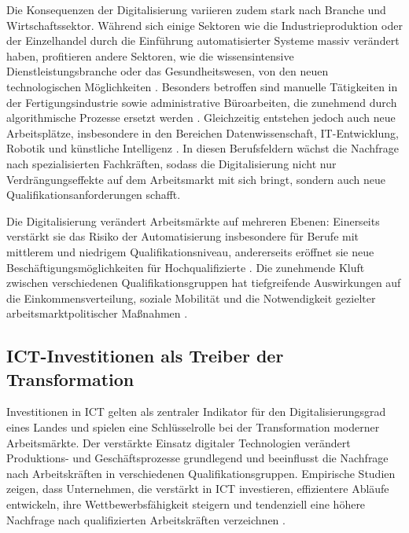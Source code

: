 Die Konsequenzen der Digitalisierung variieren zudem stark nach Branche und 
Wirtschaftssektor. Während sich einige Sektoren wie die Industrieproduktion oder der 
Einzelhandel durch die Einführung automatisierter Systeme massiv verändert haben, 
profitieren andere Sektoren, wie die wissensintensive Dienstleistungsbranche oder das 
Gesundheitswesen, von den neuen technologischen Möglichkeiten 
\parencite[vgl.][S. 1555]{autor2013thegrowth}. Besonders betroffen sind manuelle Tätigkeiten 
in der Fertigungsindustrie sowie administrative Büroarbeiten, die zunehmend durch 
algorithmische Prozesse ersetzt werden \parencite[vgl.][S. 260]{frey2013thefuture}. 
Gleichzeitig entstehen jedoch auch neue Arbeitsplätze, insbesondere in den Bereichen 
Datenwissenschaft, IT-Entwicklung, Robotik und künstliche Intelligenz 
\parencite[vgl.][S. 2510]{goos2014explaining}. In diesen Berufsfeldern wächst die Nachfrage 
nach spezialisierten Fachkräften, sodass die Digitalisierung nicht nur Verdrängungseffekte auf 
dem Arbeitsmarkt mit sich bringt, sondern auch neue Qualifikationsanforderungen schafft.

Die Digitalisierung verändert Arbeitsmärkte auf mehreren Ebenen: Einerseits verstärkt sie 
das Risiko der Automatisierung insbesondere für Berufe mit mittlerem und niedrigem 
Qualifikationsniveau, andererseits eröffnet sie neue Beschäftigungsmöglichkeiten für 
Hochqualifizierte \parencite[vgl.][S. 1555]{autor2013thegrowth}. Die zunehmende Kluft zwischen 
verschiedenen Qualifikationsgruppen hat tiefgreifende Auswirkungen auf die 
Einkommensverteilung, soziale Mobilität und die Notwendigkeit gezielter 
arbeitsmarktpolitischer Maßnahmen \parencite[S. 2510]{goos2014explaining}.


\subsection{ICT-Investitionen als Treiber der Transformation}

Investitionen in \ac{ICT} gelten als zentraler Indikator für den 
Digitalisierungsgrad eines Landes und spielen eine Schlüsselrolle bei der Transformation 
moderner Arbeitsmärkte. Der verstärkte Einsatz digitaler Technologien verändert 
Produktions- und Geschäftsprozesse grundlegend und beeinflusst die Nachfrage nach 
Arbeitskräften in verschiedenen Qualifikationsgruppen. Empirische Studien zeigen, dass 
Unternehmen, die verstärkt in \ac{ICT} investieren, effizientere Abläufe entwickeln, ihre 
Wettbewerbsfähigkeit steigern und tendenziell eine höhere Nachfrage nach qualifizierten 
Arbeitskräften verzeichnen \parencite[vgl.][S. 12]{corrado2018intangible}.


